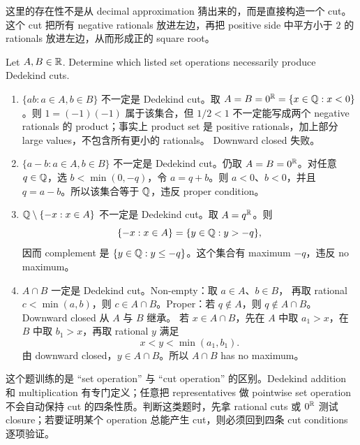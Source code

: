 \begin{explanation}
这里的存在性不是从 decimal approximation 猜出来的，而是直接构造一个 cut。这个
cut 把所有 negative rationals 放进左边，再把 positive side 中平方小于 \(2\) 的
rationals 放进左边，从而形成正的 square root。
\end{explanation}

\begin{exerciseblock}
Let \(A,B\in\mathbb{R}\). Determine which listed set operations necessarily produce
Dedekind cuts.
\end{exerciseblock}

\begin{solution}
\begin{enumerate}[label=(\alph*)]
  \item \(\{ab:a\in A,b\in B\}\) 不一定是 Dedekind cut。取
  \(A=B=0^{\mathbb{R}}=\{x\in\mathbb{Q}:x<0\}\)。则 \(1=(-1)(-1)\) 属于该集合，但
  \(1/2<1\) 不一定能写成两个 negative rationals 的 product；事实上 product set
  是 positive rationals，加上部分 large values，不包含所有更小的 rationals。
  Downward closed 失败。

  \item \(\{a-b:a\in A,b\in B\}\) 不一定是 Dedekind cut。仍取
  \(A=B=0^{\mathbb{R}}\)。对任意 \(q\in\mathbb{Q}\)，选 \(b<\min(0,-q)\)，令 \(a=q+b\)。则
  \(a<0\)、\(b<0\)，并且 \(q=a-b\)。所以该集合等于 \(\mathbb{Q}\)，违反 proper condition。

  \item \(\mathbb{Q}\setminus\{-x:x\in A\}\) 不一定是 Dedekind cut。取 \(A=q^{\mathbb{R}}\)。则
  \[
    \{-x:x\in A\}=\{y\in\mathbb{Q}:y>-q\},
  \]
  因而 complement 是 \(\{y\in\mathbb{Q}:y\leq -q\}\)。这个集合有 maximum \(-q\)，违反
  no maximum。

  \item \(A\cap B\) 一定是 Dedekind cut。Non-empty：取 \(a\in A\)、\(b\in B\)，
  再取 rational \(c<\min(a,b)\)，则 \(c\in A\cap B\)。Proper：若
  \(q\notin A\)，则 \(q\notin A\cap B\)。Downward closed 从 \(A\) 与 \(B\) 继承。
  若 \(x\in A\cap B\)，先在 \(A\) 中取 \(a_1>x\)，在 \(B\) 中取 \(b_1>x\)，再取
  rational \(y\) 满足
  \[
    x<y<\min(a_1,b_1).
  \]
  由 downward closed，\(y\in A\cap B\)。所以 \(A\cap B\) has no maximum。
\end{enumerate}
\end{solution}

\begin{explanation}
这个题训练的是 ``set operation'' 与 ``cut operation'' 的区别。Dedekind addition
和 multiplication 有专门定义；任意把 representatives 做 pointwise set operation
不会自动保持 cut 的四条性质。判断这类题时，先拿 rational cuts 或 \(0^{\mathbb{R}}\)
测试 closure；若要证明某个 operation 总能产生 cut，则必须回到四条 cut conditions
逐项验证。
\end{explanation}

